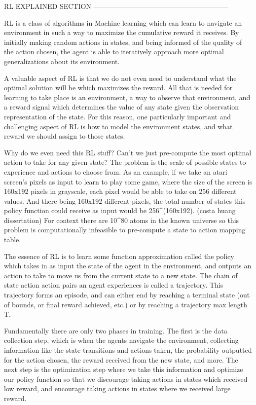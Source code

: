 RL EXPLAINED SECTION
-----------------------------------------------------------

RL is a class of algorithms in Machine learning which can learn to navigate an environment in such a way to maximize the cumulative reward it receives. By initially making random actions in states, and being informed of the quality of the action chosen, the agent is able to iteratively approach more optimal generalizations about its environment.

A valuable aspect of RL is that we do not even need to understand what the optimal solution will be which maximizes the reward. All that is needed for learning to take place is an environment, a way to observe that environment, and a reward signal which determines the value of any state given the observation representation of the state. For this reason, one particularly important and challenging aspect of RL is how to model the environment states, and what reward we should assign to those states.

Why do we even need this RL stuff? Can't we just pre-compute the most optimal action to take for any given state? The problem is the scale of possible states to experience and actions to choose from. As an example, if we take an atari screen's pixels as input to learn to play some game, where the size of the screen is 160x192 pixels in grayscale, each pixel would be able to take on 256 different values. And there being 160x192 different pixels, the total number of states this policy function could receive as input would be 256^(160x192). (costa huang dissertation) For context there are 10^80 atoms in the known universe so this problem is computationally infeasible to pre-compute a state to action mapping table.

The essence of RL is to learn some function approximation called the policy which takes in as input the state of the agent in the environment, and outputs an action to take to move us from the current state to a new state. The chain of state action action pairs an agent experiences is called a trajectory. This trajectory forms an episode, and can either end by reaching a terminal state (out of bounds, or final reward achieved, etc.) or by reaching a trajectory max length T. 

Fundamentally there are only two phases in training. The first is the data collection step, which is when the agents navigate the environment, collecting information like the state transitions and actions taken, the probability outputted for the action chosen, the reward received from the new state, and more. The next step is the optimization step where we take this information and optimize our policy function so that we discourage taking actions in states which received low reward, and encourage taking actions in states where we received large reward.


